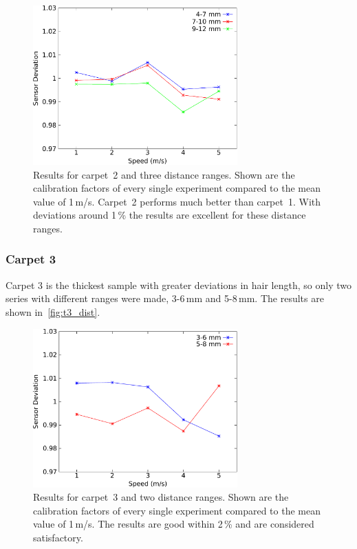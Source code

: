 \documentclass[12pt,a4paper]{article}
\begin{document}
\begin{figure}[htbp]
\begin{center}
\includegraphics[width=0.7\textwidth]{figures/T2_dist.pdf}
\caption{\label{fig:t2_dist}
Results for carpet~2 and three distance ranges.
Shown are the calibration factors of every single experiment compared to the mean value of 1\,m/s.
Carpet~2 performs much better than carpet~1.
With deviations around 1\,\% the results are excellent for these distance ranges.
}
\end{center}
\end{figure}


\subsubsection{Carpet 3}

Carpet 3 is the thickest sample with greater deviations in hair length, so only two series with different ranges were made, 3-6\,mm and 5-8\,mm.
The results are shown in~\autoref{fig:t3_dist}.

\begin{figure}[htbp]
\begin{center}
\includegraphics[width=0.7\textwidth]{figures/T3_dist.pdf}
\caption{\label{fig:t3_dist}
Results for carpet~3 and two distance ranges.
Shown are the calibration factors of every single experiment compared to the mean value of 1\,m/s.
The results are good within 2\,\% and are considered satisfactory.
}
\end{center}
\end{figure}
\end{document}
